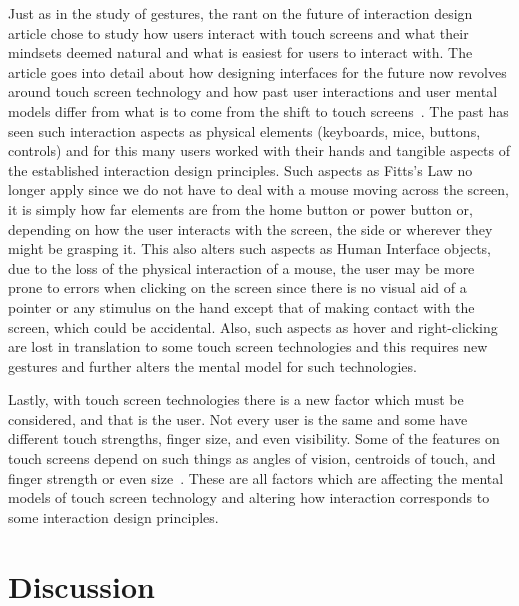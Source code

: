 \documentclass[12pt]{article} %
\begin{document}
     Just as in the study of gestures, the rant on the future of interaction design article chose to study how users interact with touch screens and what their mindsets deemed natural and what is easiest for users to interact with. The article goes into detail about how designing interfaces for the future now revolves around touch screen technology and how past user interactions and user mental models differ from what is to come from the shift to touch screens~\cite{Touch}. The past has seen such interaction aspects as physical elements (keyboards, mice, buttons, controls) and for this many users worked with their hands and tangible aspects of the established interaction design principles. Such aspects as Fitts's Law no longer apply since we do not have to deal with a mouse moving across the screen, it is simply how far elements are from the home button or power button or, depending on how the user interacts with the screen, the side or wherever they might be grasping it. This also alters such aspects as Human Interface objects, due to the loss of the physical interaction of a mouse, the user may be more prone to errors when clicking on the screen since there is no visual aid of a pointer or any stimulus on the hand except that of making contact with the screen, which could be accidental. Also, such aspects as hover and right-clicking are lost in translation to some touch screen technologies and this requires new gestures and further alters the mental model for such technologies. 
     
     Lastly, with touch screen technologies there is a new factor which must be considered, and that is the user. Not every user is the same and some have different touch strengths, finger size, and even visibility. Some of the features on touch screens depend on such things as angles of vision, centroids of touch, and finger strength or even size~\cite{Hands}. These are all factors which are affecting the mental models of touch screen technology and altering how interaction corresponds to some interaction design principles. 

\section{Discussion}
\end{document}
